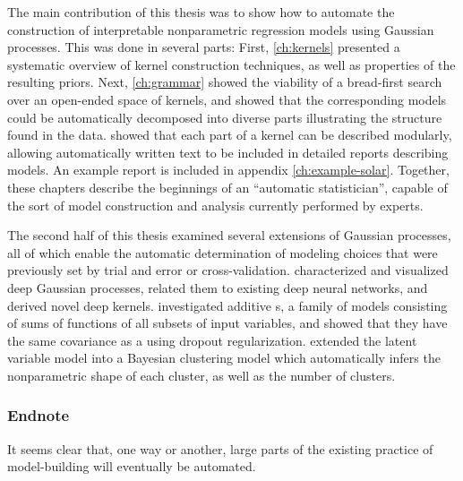 The main contribution of this thesis was to show how to automate the construction of interpretable nonparametric regression models using Gaussian processes.
This was done in several parts:
First, \cref{ch:kernels} presented a systematic overview of kernel construction techniques, as well as properties of the resulting \gp{} priors.
Next, \cref{ch:grammar} showed the viability of a bread-first search over an open-ended space of kernels, and showed that the corresponding \gp{} models could be automatically decomposed into diverse parts illustrating the structure found in the data.
 showed that each part of a kernel can be described modularly, allowing automatically written text to be included in detailed reports describing \gp{} models.
An example report is included in appendix \ref{ch:example-solar}.
Together, these chapters describe the beginnings of an ``automatic statistician'', capable of the sort of model construction and analysis currently performed by experts.

The second half of this thesis examined several extensions of Gaussian processes, all of which enable the automatic determination of modeling choices that were previously set by trial and error or cross-validation.
 characterized and visualized deep Gaussian processes, related them to existing deep neural networks, and derived novel deep kernels.
 investigated additive \gp{}s, a family of models consisting of sums of functions of all subsets of input variables, and showed that they have the same covariance as a \gp{} using dropout regularization.
 extended the \gp{} latent variable model into a Bayesian clustering model which automatically infers the nonparametric shape of each cluster, as well as the number of clusters.

\subsubsection{Endnote}
It seems clear that, one way or another, large parts of the existing practice of model-building will eventually be automated.





